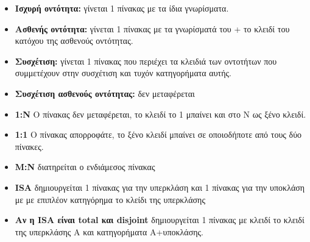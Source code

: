 \begin{itemize}
	\item	\textbf{Ισχυρή οντότητα:} γίνεται 1 πίνακας με τα ίδια γνωρίσματα.
	
	\item	\textbf{Ασθενής οντότητα:} γίνεται 1 πίνακας με τα γνωρίσματά του + 
		το κλειδί του κατόχου της ασθενούς οντότητας.
	\item	\textbf{Συσχέτιση:} γίνεται 1 πίνακας που περιέχει τα κλειδιά των οντοτήτων
		που συμμετέχουν στην συσχέτιση και τυχόν κατηγορήματα αυτής.
	\item	\textbf{Συσχέτιση ασθενούς οντότητας:} δεν μεταφέρεται
	\item	\textbf{1:Ν} Ο πίνακας δεν μεταφέρεται, το κλειδί το 1 μπαίνει και στο Ν ως ξένο κλειδί.
	\item	\textbf{1:1} Ο πίνακας απορροφάτε, το ξένο κλειδί μπαίνει σε οποιοδήποτε από τους δύο πίνακες.
	\item	\textbf{Μ:Ν} διατηρείται ο ενδιάμεσος πίνακας
	\item	\textbf{ISA} δημιουργείται 1 πίνακας για την υπερκλάση και 1 πίνακας για την υποκλάση με
		με επιπλέον κατηγόρημα το κλείδι της υπερκλάσης
	\item	\textbf{Αν η ISA είναι total και disjoint} δημιουργείται 1 πίνακας με κλειδί το κλειδί της
		υπερκλάσης Α και κατηγορήματα Α+υποκλάσης.
\end{itemize}
